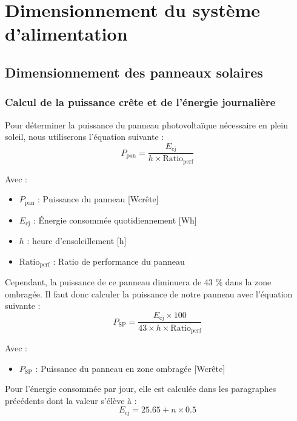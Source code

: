 \section{Dimensionnement du système d’alimentation}
\subsection{Dimensionnement des panneaux solaires}
\subsubsection{Calcul de la puissance crête et de l’énergie journalière}
Pour déterminer la puissance du panneau photovoltaïque nécessaire en plein soleil\cite{75}, nous utiliserons l'équation suivante :
\\
\begin{equation}
P_{\text{pan}} = \frac{E_{\text{cj}}}{h \times \text{Ratio}_{\text{perf}}} \tag{2.2}
\end{equation}

Avec :
\begin{itemize}
	\item \( P_{\text{pan}} \) : Puissance du panneau [Wcrête]
	\item \( E_{\text{cj}} \) : Énergie consommée quotidiennement [Wh]
	\item \( h \) : heure d’ensoleillement [h]
	\item \( \text{Ratio}_{\text{perf}} \) : Ratio de performance du panneau
\end{itemize}
Cependant, la puissance de ce panneau diminuera de 43 \% dans la zone ombragée. Il faut donc calculer la puissance de notre panneau avec l'équation suivante :
\\

\begin{equation}
P_{\text{SP}} = \frac{E_{\text{cj}} \times 100}{43 \times h \times \text{Ratio}_{\text{perf}}} \tag{2.3}
\end{equation}

Avec :
\begin{itemize}
	\item \( P_{\text{SP}} \) : Puissance du panneau en zone ombragée [Wcrête]
\end{itemize}
Pour l’énergie consommée par jour, elle est calculée dans les paragraphes précédents dont la valeur s'élève à :
\\
\begin{equation}
E_{\text{cj}} = 25.65 + n \times 0.5 \tag{2.4}
\end{equation}

